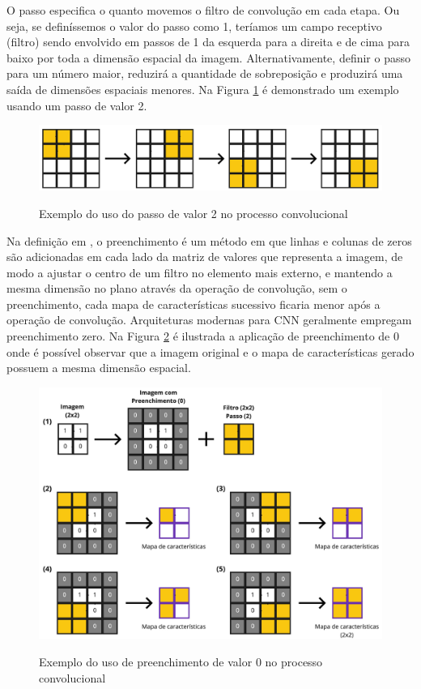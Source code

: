 \documentclass[
	12pt,				%
	oneside,			%
	a4paper,			%
	english,			%
	brazil				%
	]{abntex2ppgsi}
\begin{document}
O passo especifica o quanto movemos o filtro de convolução em cada etapa. Ou seja, se definíssemos o valor do passo como 1, teríamos um campo receptivo (filtro) sendo envolvido em passos de 1 da esquerda para a direita e de cima para baixo por toda a dimensão espacial da imagem. Alternativamente, definir o passo para um número maior, reduzirá a quantidade de sobreposição e produzirá uma saída de dimensões espaciais menores. Na Figura \ref{fig:convolution_stride_cnn} é demonstrado um exemplo usando um passo de valor 2.

\begin{figure}[H]
    \centering
    \caption{Exemplo do uso do passo de valor 2 no processo convolucional}
    \includegraphics[width=1.0\textwidth]{imagens/conceitos_basicos/convolution_stride.jpg}
    \label{fig:convolution_stride_cnn}
\end{figure}

Na definição em , o preenchimento é um método em que linhas e colunas de zeros são adicionadas em cada lado da matriz de valores que representa a imagem, de modo a ajustar o centro de um filtro no elemento mais externo, e mantendo a mesma dimensão no plano através da operação de convolução, sem o preenchimento, cada mapa de características sucessivo ficaria menor após a operação de convolução. Arquiteturas modernas para CNN geralmente empregam preenchimento zero. Na Figura \ref{fig:convolution_padding_cnn} é ilustrada a aplicação de preenchimento de 0 onde é possível observar que a imagem original e o mapa de características gerado possuem a mesma dimensão espacial.

\begin{figure}[H]
    \centering
    \caption{Exemplo do uso de preenchimento de valor 0 no processo convolucional}
    \includegraphics[width=1.0\textwidth]{imagens/conceitos_basicos/convolution_padding.jpg}
    \label{fig:convolution_padding_cnn}
\end{figure}
\end{document}
